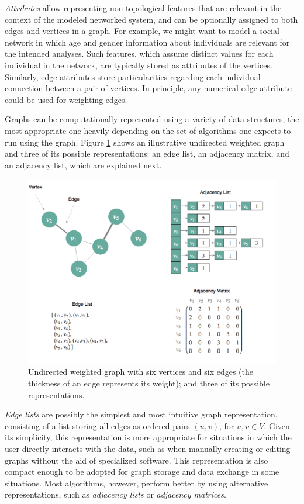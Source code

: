 \textit{Attributes} allow representing non-topological features that are relevant in the context of the modeled networked system, and can be optionally assigned to both edges and vertices in a graph.
For example, we might want to model a social network in which age and gender information about individuals are relevant for the intended analyses.
Such features, which assume distinct values for each individual in the network, are typically stored as attributes of the vertices.
Similarly, edge attributes store particularities regarding each individual connection between a pair of vertices.
In principle, any numerical edge attribute could be used for weighting edges.

Graphs can be computationally represented using a variety of data structures, the most appropriate one heavily depending on the set of algorithms one expects to run using the graph.
Figure \ref{fig:graphs} shows an illustrative undirected weighted graph and three of its possible representations: an edge list, an adjacency matrix, and an adjacency list, which are explained next.

\begin{figure}[h!]
  	\centering
    \includegraphics[width=0.9\linewidth]{figures/network_models/graphs.png}
    \caption{Undirected weighted graph with six vertices and six edges (the thickness of an edge represents its weight); and three of its possible representations.}
    \label{fig:graphs}
  \end{figure}
  

\textit{Edge lists} are possibly the simplest and most intuitive graph representation, consisting of a list storing all edges as ordered pairs $(u,v)$, for $u,v \in V$.
Given its simplicity, this representation is more appropriate for situations in which the user directly interacts with the data, such as when manually creating or editing graphs without the aid of specialized software. 
This representation is also compact enough to be adopted for graph storage and data exchange in some situations.
%
Most algorithms, however, perform better by using alternative representations, such as \textit{adjacency lists} or \textit{adjacency matrices}. 

